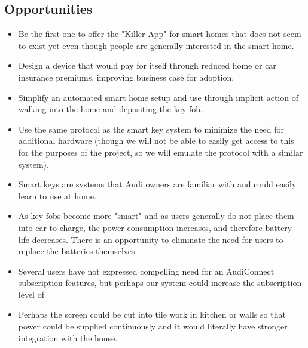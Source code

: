\subsection*{Opportunities}
\begin{itemize}

    \item Be the first one to offer the "Killer-App" for smart homes that does not seem to exist yet even though people are generally interested in the smart home. 
	\item Design a device that would pay for itself through reduced home or car insurance premiums, improving business case for adoption.
	\item Simplify an automated smart home setup and use through implicit action of walking into the home and depositing the key fob.
	\item Use the same protocol as the smart key system to minimize the need for additional hardware (though we will not be able to easily get access to this for the purposes of the project, so we will emulate the protocol with a similar system).
	\item Smart keys are systems that Audi owners are familiar with and could easily learn to use at home.
	\item As key fobs become more "smart" and as users generally do not place them into car to charge, the power consumption increases, and therefore battery life decreases. There is an opportunity to eliminate the need for users to replace the batteries themselves. 
	\item Several users have not expressed compelling need for an AudiConnect subscription features, but perhaps our system could increase the subscription level of 
	\item Perhaps the screen could be cut into tile work in kitchen or walls so that power could be supplied continuously and it would literally have stronger integration with the house.
	
\end{itemize}

